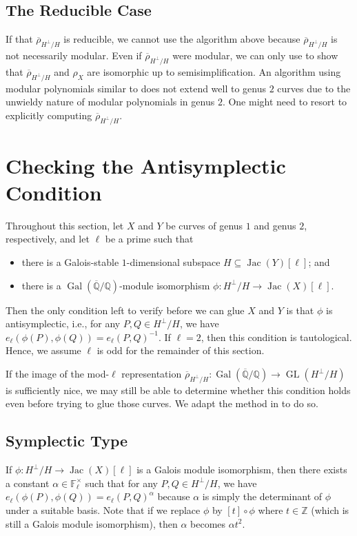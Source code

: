 \documentclass{amsproc}
\numberwithin{equation}{section}
\theoremstyle{definition}
\theoremstyle{remark}
\DeclareMathOperator{\Jac}{Jac}
\DeclareMathOperator{\GL}{GL}
\DeclareMathOperator{\Gal}{Gal}
\newcommand{\ZZ}{\mathbb Z}
\newcommand{\QQ}{\mathbb Q}
\newcommand{\FF}{\mathbb F}
\newcommand{\Qbar}{\overline{\QQ}}
\newcommand{\GalQ}{\Gal(\Qbar/\QQ)}
\newcommand{\rhoHperpH}{\overline\rho_{H^\perp\!/H}}
\begin{document}
\subsection{The Reducible Case}
\label{subsec:reducible_case}
If that $\rhoHperpH$ is reducible, we cannot use the algorithm above because $\rhoHperpH$ is not necessarily modular. 
Even if $\rhoHperpH$ were modular, we can only use  to show that $\rhoHperpH$ and $\rho_X$ are isomorphic up to semisimplification.
An algorithm using modular polynomials similar to \cite[\S 3.6.]{global_symplectic_type} does not extend well to genus $2$ curves due to the unwieldy nature of modular polynomials in genus $2$.
One might need to resort to explicitly computing $\rhoHperpH$.


\section{Checking the Antisymplectic Condition}
\label{sec:symplectic_type}
Throughout this section, let $X$ and $Y$ be curves of genus $1$ and genus $2$, respectively, and let $\ell$ be a prime such that
\begin{itemize}
    \item there is a Galois-stable $1$-dimensional subspace $H\subseteq \Jac(Y)[\ell]$; and
    \item there is a $\GalQ$-module isomorphism $\phi : H^\perp/H \to \Jac(X)[\ell]$.
\end{itemize}
Then the only condition left to verify before we can glue $X$ and $Y$ is that $\phi$ is antisymplectic, i.e., for any $P,Q\in H^\perp/H$, we have $e_\ell(\phi(P), \phi(Q)) = e_\ell(P,Q)^{-1}$. If $\ell=2$, then this condition is tautological. Hence, we assume $\ell$ is odd for the remainder of this section.

If the image of the mod-$\ell$ representation $\rhoHperpH : \GalQ \to \GL(H^\perp/H)$ is sufficiently nice, we may still be able to determine whether this condition holds even before trying to glue those curves. We adapt the method in \cite{local_symplectic_type} to do so.
\subsection{Symplectic Type}

If $\phi : H^\perp/H \to \Jac(X)[\ell]$ is a Galois module isomorphism, then there exists a constant $\alpha\in\FF_\ell^\times$ such that for any $P,Q\in H^\perp/H$, we have 
$e_\ell(\phi(P), \phi(Q)) = e_\ell(P,Q)^\alpha$
because $\alpha$ is simply the determinant of $\phi$
under a suitable basis.
Note that if we replace $\phi$ by $[t]\circ\phi$ where $t\in\ZZ$ (which is still a Galois module isomorphism), then $\alpha$ becomes $\alpha t^2$. 
\end{document}
